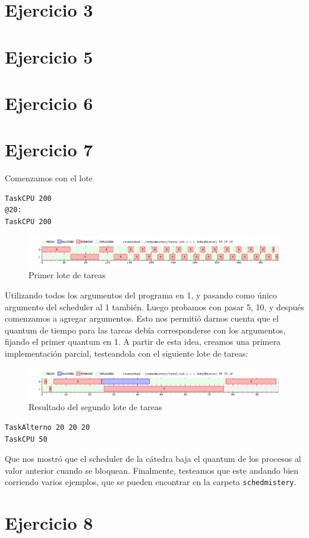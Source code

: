 \documentclass{article}
\begin{document}
\section{Ejercicio 3}



\section{Ejercicio 5}
\section{Ejercicio 6}

\section{Ejercicio 7}

Comenzamos con el lote

\begin{verbatim}
TaskCPU 200
@20:
TaskCPU 200
\end{verbatim}

\begin{figure}[h!]
\caption{Primer lote de tareas \label{grf:ex7-1}}
\centering
\includegraphics[width=15cm]{../ejercicios/ejercicio 7-1}
\end{figure}

Utilizando todos los argumentos del programa en 1, y pasando como único argumento del scheduler al 1 también. Luego probamos con pasar 5, 10, y después comenzamos a agregar argumentos. Esto nos permitió darnos cuenta que el quantum de tiempo para las tareas debía corresponderse con los argumentos, fijando el primer quantum en 1. A partir de esta idea, creamos una primera implementación parcial, testeandola con el siguiente lote de tareas:

\begin{figure}[h!]
\caption{Resultado del segundo lote de tareas \label{grf:ex7-2}}
\centering
\includegraphics[width=15cm]{../ejercicios/ejercicio 7-2}
\end{figure}

\begin{verbatim}
TaskAlterno 20 20 20
TaskCPU 50
\end{verbatim}

Que nos mostró que el scheduler de la cátedra baja el quantum de los procesos al valor anterior cuando se bloquean. Finalmente, testeamos que este andando bien corriendo varios ejemplos, que se pueden encontrar en la carpeta \verb`schedmistery`.

\section{Ejercicio 8}
\end{document}
